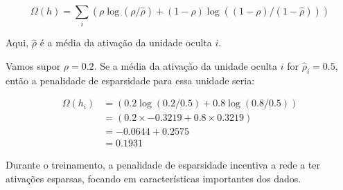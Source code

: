 \begin{apendicesenv}
		\begin{equation}
			\Omega(h) = \sum_i (\rho \log(\rho / \hat{\rho}) + (1 - \rho) \log((1 - \rho) / (1 - \hat{\rho})))
		\end{equation}
		
		
		\par Aqui, $ \hat{\rho} $ é a média da ativação da unidade oculta $ i $.

		\par  Vamos supor $ \rho = 0.2 $. Se a média da ativação da unidade oculta $ i $ for $ \hat{\rho}_i = 0.5 $, então a penalidade de esparsidade para essa unidade seria:
		
		\begin{equation}
			\begin{aligned}
				\Omega(h_i) &= (0.2 \log(0.2 / 0.5) + 0.8 \log(0.8 / 0.5)) \\
							&= (0.2 \times -0.3219 + 0.8 \times 0.3219) \\
							&= -0.0644 + 0.2575 \\
							&= 0.1931 
			\end{aligned}
		\end{equation}
		\par Durante o treinamento, a penalidade de esparsidade incentiva a rede a ter ativações esparsas, focando em características importantes dos dados.

\end{apendicesenv}









